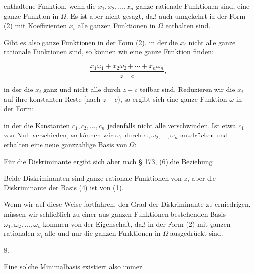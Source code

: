 enthaltene Funktion, wenn die $x_1, x_2, \ldots, x_n$ ganze rationale
Funktionen sind, eine ganze Funktion in $\Omega$. Es ist aber nicht
gesagt, daß auch umgekehrt in der Form (2) mit  Koeffizienten
 $x_i$ alle ganzen Funktionen in $\Omega$ enthalten sind.

Gibt es also ganze Funktionen in der Form (2), in der die
$x_i$ nicht alle ganze rationale Funktionen sind, so können wir eine
ganze Funktion finden:

\[
\frac{x_1 \omega_1 + x_2 \omega_2 + \cdots + x_n \omega_n}{z - c},
\]

in der die $x_i$ ganz und nicht alle durch $z - c$ teilbar sind.
Reduzieren wir die $x_i$ auf ihre konstanten Reste (nach $z - c$),
so ergibt sich eine ganze Funktion $\omega$ in der Form:


in der die Konstanten $c_1, c_2, \ldots, c_n$ jedenfalls nicht alle verschwinden.
Ist etwa $c_1$ von Null verschieden, so können wir $\omega_1$
durch $\omega, \omega_2, \ldots, \omega_n$ ausdrücken und erhalten eine neue ganzzahlige
 Basis von $\Omega$:


Für die Diskriminante ergibt sich aber nach § 173, (6) die
Beziehung:


Beide Diskriminanten sind ganze rationale Funktionen von $z$,
aber die Diskriminante der Basis (4) ist von  (1).

Wenn wir auf diese Weise fortfahren, den Grad der Diskriminante
 zu erniedrigen, müssen wir schließlich zu einer aus
ganzen Funktionen bestehenden Basis $\omega_1, \omega_2, \ldots, \omega_n$ kommen von
der Eigenschaft, daß in der Form (2) mit ganzen rationalen $x_i$
alle und nur die ganzen Funktionen in $\Omega$ ausgedrückt sind.

8. 



Eine solche Minimalbasis existiert also immer.

